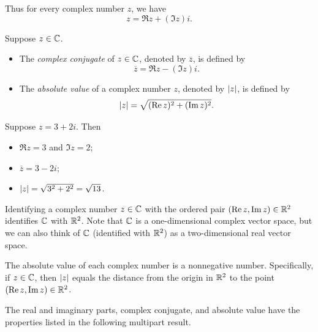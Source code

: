 Thus for every complex number $z$, we have
\[ z = \Re z + (\Im z)i. \]

\begin{definition}\label{ax:4.2}
Suppose $z\in\mathbb{C}$.
\begin{itemize}
\item The \emph{complex conjugate} of $z\in\mathbb{C}$, denoted by $\overline{z}$, is
  defined by
  \[ \overline{z} = \Re z - (\Im z)i. \]
\item The \emph{absolute value} of a complex number $z$, denoted by $\lvert z \rvert$,
  is defined by
  \[ \lvert z \rvert = \sqrt{(\operatorname{Re} z)^2+(\operatorname{Im} z)^2}. \]
\end{itemize}
\end{definition}

\begin{example}\label{ax:4.3}
Suppose $z=3+2i$. Then
\begin{itemize}
\item $\Re z=3$ and $\Im z=2$;
\item $\overline{z}=3-2i$;
\item $\lvert z \rvert=\sqrt{3^2+2^2}=\sqrt{13}$.
\end{itemize}
\end{example}

Identifying a complex number $z\in\mathbb{C}$ with the ordered pair
$(\operatorname{Re} z,\operatorname{Im} z)\in\mathbb{R}^2$ identifies $\mathbb{C}$ with $\mathbb{R}^2$. Note that $\mathbb{C}$ is a
one-dimensional complex vector space, but we can also think of $\mathbb{C}$
(identified with $\mathbb{R}^2$) as a two-dimensional real vector space.

The absolute value of each complex number is a nonnegative number.
Specifically, if $z\in\mathbb{C}$, then $\lvert z \rvert$ equals the distance from the origin in
$\mathbb{R}^2$ to the point $(\operatorname{Re} z,\operatorname{Im} z)\in\mathbb{R}^2$.

%
The real and imaginary parts, complex conjugate, and absolute value have the
properties listed in the following multipart result.

